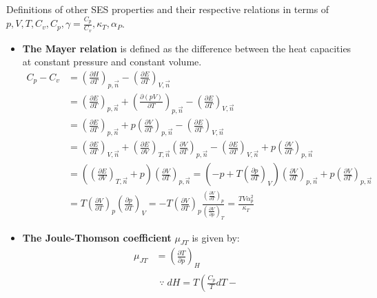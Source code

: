 \begin{defn}
    Definitions of other SES properties and their respective relations 
    in terms of \( p, V, T, C_v, C_p, \gamma = \frac{C_p}{C_v}, \kappa_T, \alpha_P \).
\begin{itemize}
\item 
\textbf{The Mayer relation} is defined as the difference 
between the heat capacities at constant pressure and constant volume.
\begin{align*}
C_p - C_v &=\left( \frac{\partial H}{\partial T} \right)_{p, \vec{n}}
-\left( \frac{\partial E}{\partial T} \right)_{V, \vec{n}}\\
&= \left( \frac{\partial E}{\partial T} \right)_{p, \vec{n}} 
+ \left( \frac{\partial (pV)}{\partial T} \right)_{p, \vec{n}} 
- \left( \frac{\partial E}{\partial T} \right)_{V, \vec{n}} \\
&= \left( \frac{\partial E}{\partial T} \right)_{p, \vec{n}} 
+ p \left( \frac{\partial V}{\partial T} \right)_{p, \vec{n}} 
- \left( \frac{\partial E}{\partial T} \right)_{V, \vec{n}} \\
&= \left( \frac{\partial E}{\partial T} \right)_{V, \vec{n}} + 
\left( \frac{\partial E}{\partial V} \right)_{T, \vec{n}} 
\left( \frac{\partial V}{\partial T} \right)_{p, \vec{n}} 
-\left( \frac{\partial E}{\partial T} \right)_{V, \vec{n}}
+ p \left( \frac{\partial V}{\partial T} \right)_{p, \vec{n}} \\
&= \left(\left( \frac{\partial E}{\partial V} \right)_{T, \vec{n}} 
+ p \right)\left( \frac{\partial V}{\partial T} \right)_{p, \vec{n}} 
= \left( -p + T \left( \frac{\partial p}{\partial T} \right)_V \right) \left( \frac{\partial V}{\partial T} \right)_{p, \vec{n}} 
+ p \left( \frac{\partial V}{\partial T} \right)_{p, \vec{n}} \\
&= \boxed{T \left( \frac{\partial V}{\partial T} \right)_p 
\left( \frac{\partial p}{\partial T} \right)_V }
=\boxed{- T \left( \frac{\partial V}{\partial T} \right)_p 
\frac{\left( \frac{\partial V}{\partial T} \right)_p}
{\left( \frac{\partial V}{\partial p} \right)_T}} 
=\boxed{\frac{TV \alpha_p^2}{\kappa_T}}
\end{align*}
\item 
\textbf{The Joule-Thomson coefficient} \(\mu_{JT}\) is given by:
\begin{align*}
    \mu_{JT} &= \left( \frac{\partial T}{\partial p} \right)_H \\
&\boxed{\begin{gathered}
    \because \; dH = T \left( \frac{C_p}{T} dT - 

\end{gathered}}
\end{align*}
\end{itemize}
\end{defn}

